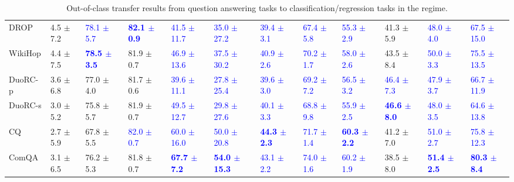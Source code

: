 \begin{landscape}
\begin{table}[t]
\begin{adjustbox}{max width=2\textwidth}
\begin{tabular}{ l l l l l  l l l l  l l l }
DROP & 4.5 $\pm$ 7.2 & \textcolor{blue}{78.1 $\pm$ 5.7} & \textbf{\textcolor{blue}{82.1 $\pm$ 0.9}} & \textcolor{blue}{41.5 $\pm$ 11.7} & \textcolor{blue}{35.0 $\pm$ 27.2} & \textcolor{blue}{39.4 $\pm$ 3.1} & \textcolor{blue}{67.4 $\pm$ 5.8} & \textcolor{blue}{55.3 $\pm$ 2.9} & 41.3 $\pm$ 5.9 & \textcolor{blue}{48.0 $\pm$ 4.0} & \textcolor{blue}{67.5 $\pm$ 15.0}\\
WikiHop & 4.4 $\pm$ 7.5 & \textbf{\textcolor{blue}{78.5 $\pm$ 3.5}} & 81.9 $\pm$ 0.7 & \textcolor{blue}{46.9 $\pm$ 13.6} & \textcolor{blue}{37.5 $\pm$ 30.2} & \textcolor{blue}{40.9 $\pm$ 2.6} & \textcolor{blue}{70.2 $\pm$ 1.7} & \textcolor{blue}{58.0 $\pm$ 2.6} & 43.5 $\pm$ 8.4 & \textcolor{blue}{50.0 $\pm$ 3.3} & \textcolor{blue}{75.5 $\pm$ 13.5}\\
DuoRC-p & 3.6 $\pm$ 6.8 & 77.0 $\pm$ 4.0 & 81.7 $\pm$ 0.6 & \textcolor{blue}{39.6 $\pm$ 11.1} & \textcolor{blue}{27.8 $\pm$ 25.4} & \textcolor{blue}{39.6 $\pm$ 3.0} & \textcolor{blue}{69.2 $\pm$ 7.2} & \textcolor{blue}{56.5 $\pm$ 3.2} & \textcolor{blue}{46.4 $\pm$ 7.3} & \textcolor{blue}{47.9 $\pm$ 3.7} & \textcolor{blue}{66.7 $\pm$ 11.9}\\
DuoRC-s & 3.0 $\pm$ 5.2 & 75.8 $\pm$ 5.7 & 81.9 $\pm$ 0.7 & \textcolor{blue}{49.5 $\pm$ 12.7} & \textcolor{blue}{29.8 $\pm$ 27.6} & \textcolor{blue}{40.1 $\pm$ 3.3} & \textcolor{blue}{68.8 $\pm$ 9.8} & \textcolor{blue}{55.9 $\pm$ 2.5} & \textbf{\textcolor{blue}{46.6 $\pm$ 8.0}} & \textcolor{blue}{48.0 $\pm$ 3.5} & \textcolor{blue}{64.6 $\pm$ 13.8}\\
CQ & 2.7 $\pm$ 5.9 & 67.8 $\pm$ 5.5 & \textcolor{blue}{82.0 $\pm$ 0.7} & \textcolor{blue}{60.0 $\pm$ 16.0} & \textcolor{blue}{50.0 $\pm$ 20.8} & \textbf{\textcolor{blue}{44.3 $\pm$ 2.3}} & \textcolor{blue}{71.7 $\pm$ 1.4} & \textbf{\textcolor{blue}{60.3 $\pm$ 2.2}} & 41.2 $\pm$ 7.0 & \textcolor{blue}{51.0 $\pm$ 2.7} & \textcolor{blue}{75.8 $\pm$ 12.3}\\
ComQA & 3.1 $\pm$ 6.5 & 76.2 $\pm$ 5.3 & 81.8 $\pm$ 0.7 & \textbf{\textcolor{blue}{67.7 $\pm$ 7.2}} & \textbf{\textcolor{blue}{54.0 $\pm$ 15.3}} & \textcolor{blue}{43.1 $\pm$ 2.2} & \textcolor{blue}{74.0 $\pm$ 1.6} & \textcolor{blue}{60.2 $\pm$ 1.9} & 38.5 $\pm$ 8.0 & \textbf{\textcolor{blue}{51.4 $\pm$ 2.5}} & \textbf{\textcolor{blue}{80.3 $\pm$ 8.4}}\\
\bottomrule
\end{tabular}
\end{adjustbox}
\caption{Out-of-class transfer results from question answering tasks to classification/regression tasks in the  regime.}
\label{tbla7c}
\end{table}
\end{landscape}